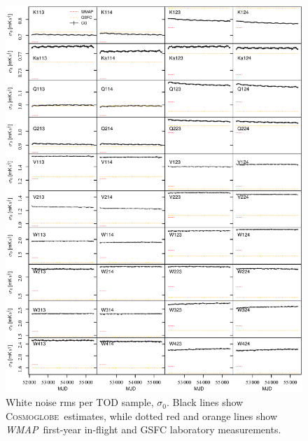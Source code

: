 \documentclass[twocolumn]{../../common/aa}
\def\WMAP{\emph{WMAP}}
\newcommand{\cosmoglobe}{\textsc{Cosmoglobe}}
\begin{document}
\begin{figure}[p]
	\centering
	\includegraphics[width=\textwidth]{figures/instpar_CG_sigma0_v1.pdf}
	\caption{White noise rms per TOD sample, $\sigma_0$. Black lines show \cosmoglobe\ estimates, while dotted red and orange lines show \WMAP\ first-year in-flight and GSFC laboratory measurements.}

	\label{fig:sigma0}
\end{figure}
\end{document}
